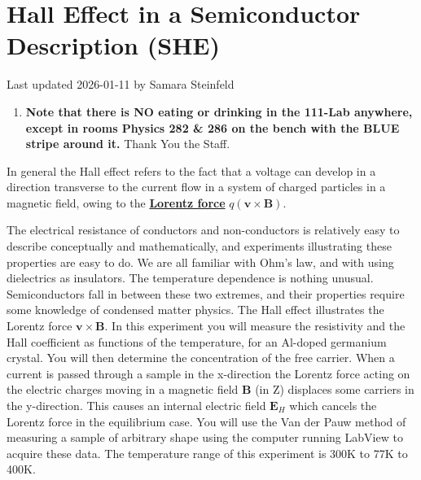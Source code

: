 \documentclass{../lab}
\begin{document}
\maketitle

\tableofcontents

\section{Hall Effect in a Semiconductor Description (SHE)}

Last updated 2026-01-11 by Samara Steinfeld

\begin{enumerate}
    \item \textbf{Note that there is NO eating or drinking in the 111-Lab anywhere, except in rooms Physics 282 \& 286 on the bench with the BLUE stripe around it.} Thank You the Staff.

\end{enumerate}

In general the Hall effect refers to the fact that a voltage can develop in a direction transverse to the current flow in a system of charged particles in a magnetic field, owing to the \href{https://berkeley-physics111b.github.io/assets/pdf/oldwebsitestructure/Lorentz\%20force.pdf}{\textbf{Lorentz force}} $q(\mathbf{v} \times \mathbf{B})$.

The electrical resistance of conductors and non-conductors is relatively easy to describe conceptually and mathematically, and experiments illustrating these properties are easy to do. We are all familiar with Ohm's law, and with using dielectrics as insulators. The temperature dependence is nothing unusual. Semiconductors fall in between these two extremes, and their properties require some knowledge of condensed matter physics. The Hall effect illustrates the Lorentz force $\mathbf{v} \times \mathbf{B}$. In this experiment you will measure the resistivity and the Hall coefficient as functions of the temperature, for an Al-doped germanium crystal. You will then determine the concentration of the free carrier. When a current is passed through a sample in the x-direction the Lorentz force acting on the electric charges moving in a magnetic field \textbf{B} (in Z) displaces some carriers in the y-direction. This causes an internal electric field $\mathbf{E}_{H}$ which cancels the Lorentz force in the equilibrium case. You will use the Van der Pauw method of measuring a sample of arbitrary shape using the computer running LabView to acquire these data. The temperature range of this experiment is 300K to 77K to 400K.
\end{document}
